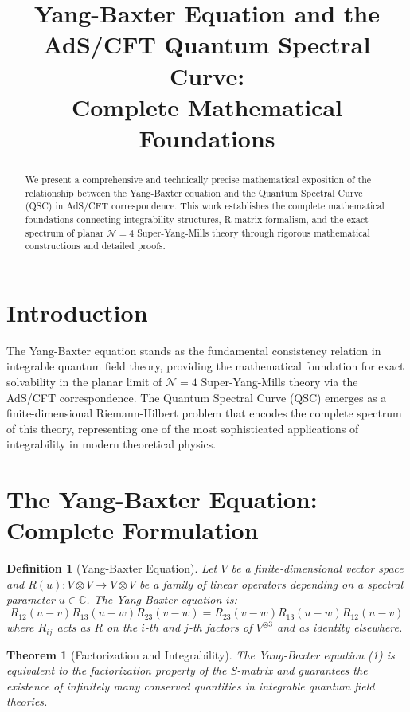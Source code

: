 \documentclass[11pt]{article}
\title{Yang-Baxter Equation and the AdS/CFT Quantum Spectral Curve: \\
Complete Mathematical Foundations}
\author{}
\date{}
\newtheorem{theorem}{Theorem}
\newtheorem{definition}{Definition}
\begin{document}
\maketitle

\begin{abstract}
We present a comprehensive and technically precise mathematical exposition of the relationship between the Yang-Baxter equation and the Quantum Spectral Curve (QSC) in AdS/CFT correspondence. This work establishes the complete mathematical foundations connecting integrability structures, R-matrix formalism, and the exact spectrum of planar $\mathcal{N}=4$ Super-Yang-Mills theory through rigorous mathematical constructions and detailed proofs.
\end{abstract}

\section{Introduction}

The Yang-Baxter equation stands as the fundamental consistency relation in integrable quantum field theory, providing the mathematical foundation for exact solvability in the planar limit of $\mathcal{N}=4$ Super-Yang-Mills theory via the AdS/CFT correspondence. The Quantum Spectral Curve (QSC) emerges as a finite-dimensional Riemann-Hilbert problem that encodes the complete spectrum of this theory, representing one of the most sophisticated applications of integrability in modern theoretical physics.

\section{The Yang-Baxter Equation: Complete Formulation}

\begin{definition}[Yang-Baxter Equation]
Let $V$ be a finite-dimensional vector space and $R(u): V \otimes V \to V \otimes V$ be a family of linear operators depending on a spectral parameter $u \in \mathbb{C}$. The Yang-Baxter equation is:
\begin{equation}
R_{12}(u-v) R_{13}(u-w) R_{23}(v-w) = R_{23}(v-w) R_{13}(u-w) R_{12}(u-v)
\end{equation}
where $R_{ij}$ acts as $R$ on the $i$-th and $j$-th factors of $V^{\otimes 3}$ and as identity elsewhere.
\end{definition}

\begin{theorem}[Factorization and Integrability]
The Yang-Baxter equation (1) is equivalent to the factorization property of the S-matrix and guarantees the existence of infinitely many conserved quantities in integrable quantum field theories.
\end{theorem}
\end{document}

